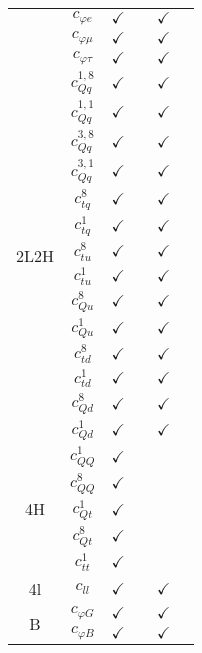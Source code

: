 \documentclass{article}
\begin{document}
\begin{table}[H]
\begin{tabular}{|c|c|c|c|c|c|}
 & $c_{\varphi e}$ & $\checkmark$ &  & $\checkmark$ & \\ \cline{2-6}
 & $c_{\varphi \mu}$ & $\checkmark$ &  & $\checkmark$ & \\ \cline{2-6}
 & $c_{\varphi \tau}$ & $\checkmark$ &  & $\checkmark$ & 
\\ \hline
\multirow{14}{*}{2L2H}
 & $c_{Qq}^{1,8}$ & $\checkmark$ &  & $\checkmark$ & \\ \cline{2-6}
 & $c_{Qq}^{1,1}$ & $\checkmark$ &  & $\checkmark$ & \\ \cline{2-6}
 & $c_{Qq}^{3,8}$ & $\checkmark$ &  & $\checkmark$ & \\ \cline{2-6}
 & $c_{Qq}^{3,1}$ & $\checkmark$ &  & $\checkmark$ & \\ \cline{2-6}
 & $c_{tq}^{8}$ & $\checkmark$ &  & $\checkmark$ & \\ \cline{2-6}
 & $c_{tq}^{1}$ & $\checkmark$ &  & $\checkmark$ & \\ \cline{2-6}
 & $c_{tu}^{8}$ & $\checkmark$ &  & $\checkmark$ & \\ \cline{2-6}
 & $c_{tu}^{1}$ & $\checkmark$ &  & $\checkmark$ & \\ \cline{2-6}
 & $c_{Qu}^{8}$ & $\checkmark$ &  & $\checkmark$ & \\ \cline{2-6}
 & $c_{Qu}^{1}$ & $\checkmark$ &  & $\checkmark$ & \\ \cline{2-6}
 & $c_{td}^{8}$ & $\checkmark$ &  & $\checkmark$ & \\ \cline{2-6}
 & $c_{td}^{1}$ & $\checkmark$ &  & $\checkmark$ & \\ \cline{2-6}
 & $c_{Qd}^{8}$ & $\checkmark$ &  & $\checkmark$ & \\ \cline{2-6}
 & $c_{Qd}^{1}$ & $\checkmark$ &  & $\checkmark$ & 
\\ \hline
\multirow{5}{*}{4H}
 & $c_{QQ}^{1}$ & $\checkmark$ &  & & \\ \cline{2-6}
 & $c_{QQ}^{8}$ & $\checkmark$ &  & & \\ \cline{2-6}
 & $c_{Qt}^{1}$ & $\checkmark$ &  & & \\ \cline{2-6}
 & $c_{Qt}^{8}$ & $\checkmark$ &  & & \\ \cline{2-6}
 & $c_{tt}^{1}$ & $\checkmark$ &  & & 
\\ \hline
\multirow{1}{*}{4l}
 & $c_{ll}$ & $\checkmark$ &  & $\checkmark$ & 
\\ \hline
\multirow{7}{*}{B}
 & $c_{\varphi G}$ & $\checkmark$ &  & $\checkmark$ & \\ \cline{2-6}
 & $c_{\varphi B}$ & $\checkmark$ &  & $\checkmark$ & \\ \cline{2-6}

\end{tabular}
\end{table}
\end{document}
